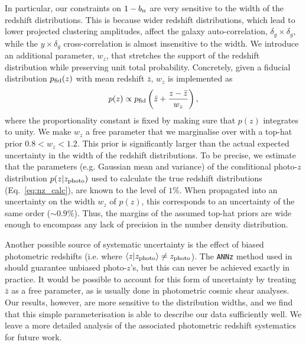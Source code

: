 \documentclass[useAMS,usenatbib]{mn2e}
\def\bH{b_{\scriptscriptstyle\rm H}}
\begin{document}
      In particular, our constraints on $1-\bH$ are very sensitive to the width of the redshift distributions. This is because wider redshift distributions, which lead to lower projected clustering amplitudes, affect the galaxy auto-correlation, $\delta_g\times \delta_g$, while the $y\times\delta_g$ cross-correlation is almost insensitive to the width. We introduce an additional parameter, $w_z$, that stretches the support of the redshift distribution while preserving unit total probability. Concretely, given a fiducial distribution $p_{\rm fid}(z)$ with mean redshift $\bar{z}$, $w_z$ is implemented as
      \begin{equation}
        p(z)\propto p_{\rm fid}\left(\bar{z}+\frac{z-\bar{z}}{w_z}\right),
      \end{equation}
      where the proportionality constant is fixed by making sure that $p(z)$ integrates to unity. We make $w_z$ a free parameter that we marginalise over with a top-hat prior $0.8<w_z<1.2$. This prior is significantly larger than the actual expected uncertainty in the width of the redshift distributions. To be precise, we estimate that the parameters (e.g. Gaussian mean and variance) of the conditional photo-$z$ distribution $p(z|z_{\rm photo})$ used to calculate the true redshift distributions (Eq.\!~\ref{eq:nz_calc}), are known to the level of $1\%$. When propagated into an uncertainty on the width $w_z$ of $p(z)$, this corresponds to an uncertainty of the same order ($\sim0.9\%$). Thus, the margins of the assumed top-hat priors are wide enough to encompass any lack of precision in the number density distribution.
      
      Another possible source of systematic uncertainty is the effect of biased photometric redshifts (i.e. where $\langle z|z_{\rm photo}\rangle\neq z_{\rm photo}$). The {\tt ANNz} method used in \cite{2018MNRAS.481.1133P} should guarantee unbiased photo-$z$'s, but this can never be achieved exactly in practice. It would be possible to account for this form of uncertainty by treating $\bar{z}$ as a free parameter, as is usually done in photometric cosmic shear analyses. Our results, however, are more sensitive to the distribution widths, and we find that this simple parameterisation is able to describe our data sufficiently well. We leave a more detailed analysis of the associated photometric redshift systematics for future work.
\end{document}
